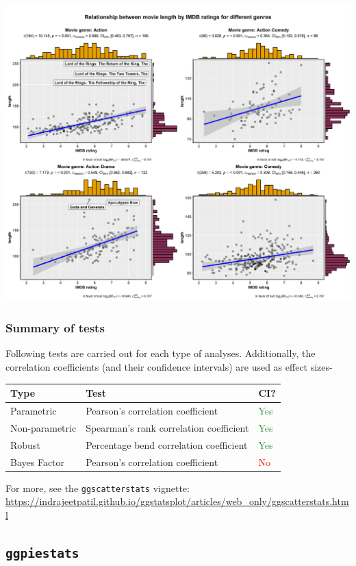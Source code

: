 \documentclass[]{article}
\begin{document}
\includegraphics[width=1\linewidth]{./figures/paper-ggscatterstats3-1}

\hypertarget{summary-of-tests-2}{%
\subsubsection{Summary of tests}\label{summary-of-tests-2}}

Following tests are carried out for each type of analyses. Additionally,
the correlation coefficients (and their confidence intervals) are used
as effect sizes-

\begin{longtable}[]{@{}lll@{}}
\toprule
Type & Test & CI?\tabularnewline
\midrule
\endhead
Parametric & Pearson's correlation coefficient &
\textcolor{ForestGreen}{Yes}\tabularnewline
Non-parametric & Spearman's rank correlation coefficient &
\textcolor{ForestGreen}{Yes}\tabularnewline
Robust & Percentage bend correlation coefficient &
\textcolor{ForestGreen}{Yes}\tabularnewline
Bayes Factor & Pearson's correlation coefficient &
\textcolor{red}{No}\tabularnewline
\bottomrule
\end{longtable}

For more, see the \texttt{ggscatterstats} vignette:
\url{https://indrajeetpatil.github.io/ggstatsplot/articles/web_only/ggscatterstats.html}

\hypertarget{ggpiestats}{%
\subsection{\texorpdfstring{\texttt{ggpiestats}}{ggpiestats}}\label{ggpiestats}}
\end{document}
